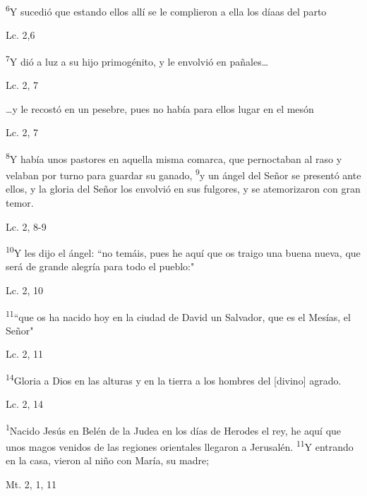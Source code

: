 \documentclass[a4paper,11pt]{article}
\begin{document}
      \textsuperscript{6}Y sucedió que estando ellos allí se le complieron a ella los díaas del parto
      \begin{flushright}
        Lc. 2,6        
      \end{flushright}
      
      \textsuperscript{7}Y dió a luz a su hijo primogénito, y le envolvió en pañales\ldots
      \begin{flushright}
        Lc. 2, 7          
      \end{flushright}
      
      \ldots y le recostó en un pesebre, pues no había para ellos lugar en el mesón      
      \begin{flushright}
        Lc. 2, 7         
      \end{flushright}
      
      \textsuperscript{8}Y había unos pastores en aquella misma comarca, que pernoctaban al raso y velaban por turno para guardar su ganado, \textsuperscript{9}y un ángel
      del Señor se presentó ante ellos, y la gloria del Señor los envolvió en sus fulgores, y se atemorizaron con gran temor.
      \begin{flushright}
        Lc. 2, 8-9         
      \end{flushright}
      
      \textsuperscript{10}Y les dijo el ángel: ``no temáis, pues he aquí que os traigo una buena nueva, que será de grande alegría para todo el pueblo:"
      \begin{flushright}
        Lc. 2, 10         
      \end{flushright}

      \textsuperscript{11}``que os ha nacido hoy en la ciudad de David un Salvador, que es el Mesías, el Señor"
      \begin{flushright}
        Lc. 2, 11       
      \end{flushright}
      
      \textsuperscript{14}Gloria a Dios en las alturas y en la tierra a los hombres del [divino] agrado.
      \begin{flushright}
        Lc. 2, 14        
      \end{flushright}
      
      \textsuperscript{1}Nacido Jesús en Belén de la Judea en los días de Herodes el rey, he aquí que unos magos venidos de las regiones orientales llegaron a Jerusalén.
      \textsuperscript{11}Y entrando en la casa, vieron al niño con María, su madre;
      \begin{flushright}
        Mt. 2, 1, 11        
      \end{flushright}
      
\end{document}
